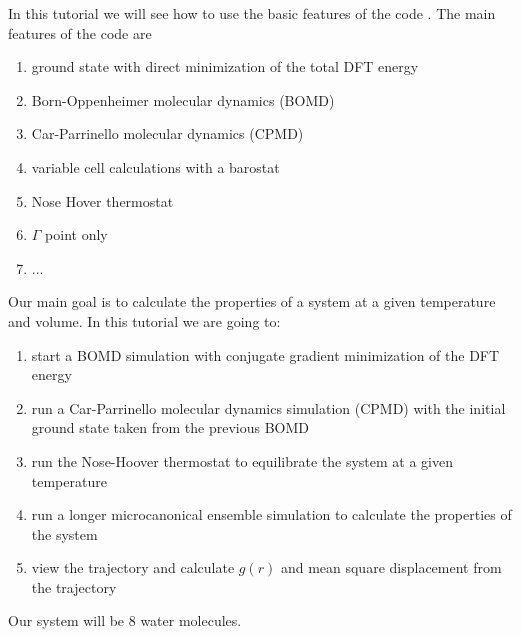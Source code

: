 \documentclass[landscape]{foils}
\begin{document}
In this tutorial we will see how to use the basic features of the code . The main features of the code are
\begin{enumerate}
\item ground state with direct minimization of the total DFT energy
\item Born-Oppenheimer molecular dynamics (BOMD)
\item Car-Parrinello molecular dynamics (CPMD)
\item variable cell calculations with a barostat
\item Nose Hover thermostat
\item $\Gamma$ point only
\item ...
\end{enumerate}
Our main goal is to calculate the properties of a system at a given temperature and volume. In this tutorial we are going to:
\begin{enumerate}
\item start a BOMD simulation with conjugate gradient minimization of the DFT energy
\item run a Car-Parrinello molecular dynamics simulation (CPMD) with the initial ground state taken from the previous BOMD
\item run the Nose-Hoover thermostat to equilibrate the system at a given temperature
\item run a longer microcanonical ensemble simulation to calculate the properties of the system
\item view the trajectory and calculate $g(r)$ and mean square displacement from the trajectory
\end{enumerate}
Our system will be 8 water molecules.
\end{document}
